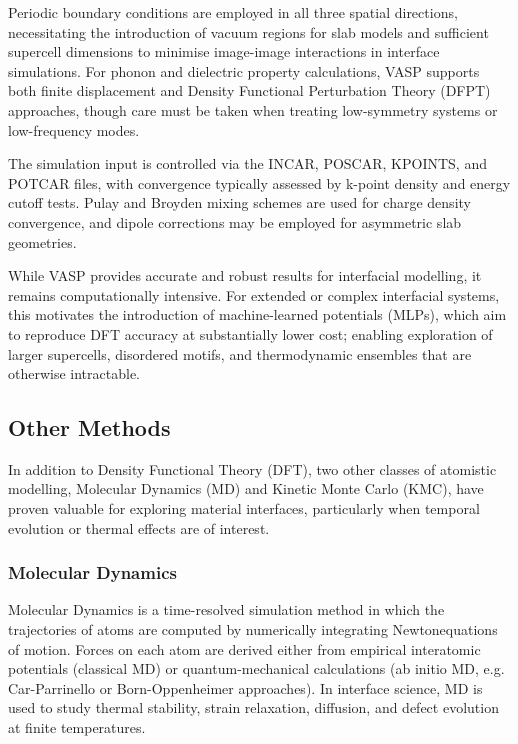 Periodic boundary conditions are employed in all three spatial directions, necessitating the introduction of vacuum
regions for slab models and sufficient supercell dimensions to minimise image-image interactions in interface
simulations. For phonon and dielectric property calculations, VASP supports both finite displacement and Density
Functional Perturbation Theory (DFPT) approaches, though care must be taken when treating low-symmetry systems or
low-frequency modes.

The simulation input is controlled via the INCAR, POSCAR, KPOINTS, and POTCAR files, with convergence typically
assessed by k-point density and energy cutoff tests. Pulay and Broyden mixing schemes are used for charge density
convergence, and dipole corrections may be employed for asymmetric slab geometries.

While VASP provides accurate and robust results for interfacial modelling, it remains computationally intensive. For
extended or complex interfacial systems, this motivates the introduction of machine-learned potentials (MLPs), which
aim to reproduce DFT accuracy at substantially lower cost; enabling exploration of larger supercells, disordered
motifs, and thermodynamic ensembles that are otherwise intractable.

\subsection{Other Methods}

In addition to Density Functional Theory (DFT), two other classes of atomistic modelling, Molecular Dynamics (MD)
and Kinetic Monte Carlo (KMC), have proven valuable for exploring material interfaces, particularly when temporal
evolution or thermal effects are of interest.

\subsubsection{Molecular Dynamics}

Molecular Dynamics is a time-resolved simulation method in which the trajectories of atoms are computed by
numerically integrating Newton\rqss equations of motion. Forces on each atom are derived either from empirical
interatomic potentials (classical MD) or quantum-mechanical calculations (ab initio MD, e.g. Car-Parrinello or
Born-Oppenheimer approaches). In interface science, MD is used to study thermal stability, strain relaxation,
diffusion, and defect evolution at finite temperatures.

